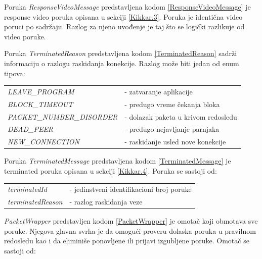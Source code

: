 \documentclass[12pt,oneside]{memoir}
\begin{document}
Poruka \textit{ResponseVideoMessage} predstavljena kodom \ref{ResponseVideoMessage} je response video poruka opisana u sekciji \ref{Kikkar.3}. Poruka je identična video poruci po sadržaju. Razlog za njeno uvođenje je taj što se logički razlikuje od video poruke.




Poruka \textit{TerminatedReason} predstavljena kodom \ref{TerminatedReason} sadrži informaciju o razlogu raskidanja konekcije. Razlog može biti jedan od enum tipova:
 
\begin{center}
\begin{tabular}{ p{6.4cm} p{7.6cm} }
 \textit{LEAVE\_PROGRAM} & - zatvaranje aplikacije \\ 
 \textit{BLOCK\_TIMEOUT} & - predugo vreme čekanja bloka \\ 
 \textit{PACKET\_NUMBER\_DISORDER} & - dolazak paketa u krivom redosledu \\ 
 \textit{DEAD\_PEER} & - predugo nejavljanje parnjaka \\ 
 \textit{NEW\_CONNECTION} & - raskidanje usled nove konekcije \\  
\end{tabular}
\end{center}




Poruka \textit{TerminatedMessage} predstavljena kodom \ref{TerminatedMessage} je terminated poruka opisana u sekciji \ref{Kikkar.4}. Poruka se sastoji od:
 
\begin{center}
\begin{tabular}{ p{4cm} p{10cm} }
 \textit{terminatedId} & - jedinstveni identifikacioni broj poruke \\ 
 \textit{terminatedReason} & - razlog raskidanja veze \\ 
\end{tabular}
\end{center}




\textit{PacketWrapper} predstavljen kodom \ref{PacketWrapper} je omotač koji obmotava sve poruke. Njegova glavna svrha je da omogući proveru dolaska poruka u pravilnom redosledu kao i da eliminiše ponovljene ili prijavi izgubljene poruke. Omotač se sastoji od:
 
\end{document}
